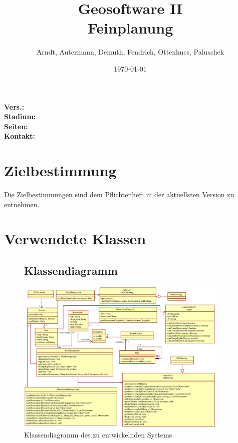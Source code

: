 \documentclass[a4paper,11pt]{scrartcl}
\begin{document}
\title{Geosoftware II \\ \small Feinplanung}
\author{Arndt, Autermann, Demuth, Fendrich, Ottenhues, Paluschek}
\date{\today}
\maketitle
\thispagestyle{empty}

\begin{center}
\bf Vers.: \MyVersion \\
\bf Stadium: \MyStatus\\
\bf Seiten: \thelastpage \\
\bf Kontakt: \email \\
\end{center}
\newpage

\tableofcontents

\newpage

\section{Zielbestimmung}
	Die Zielbestimmungen sind dem Pflichtenheft in der aktuellsten Version zu entnehmen.\\

\section{Verwendete Klassen}

\begin{landscape}
\begin{figure}[h]
\subsection{Klassendiagramm}
		\centering
		\includegraphics[width=0.90\textwidth]{images/classes.eps}
		\caption{Klassendiagramm des zu entwickelnden Systems}
		\label{Klassendiagramm}

\end{figure}
\end{landscape}
\end{document}
